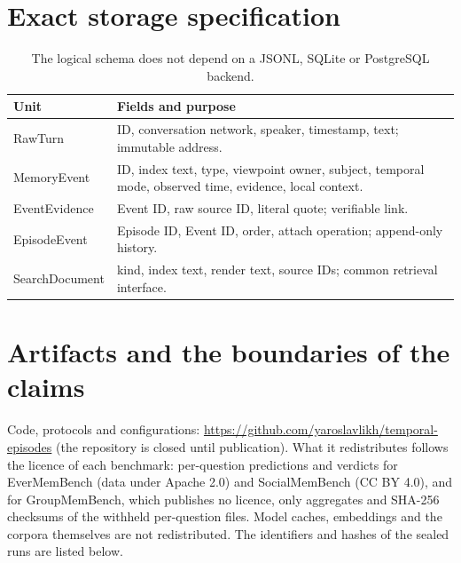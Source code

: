 \documentclass[11pt,a4paper]{article}
\begin{document}
\section{Exact storage specification}

\begin{table}[ht]
\centering\small
\begin{tabularx}{\linewidth}{lX}
\toprule
Unit & Fields and purpose\\
\midrule
RawTurn & ID, conversation network, speaker, timestamp, text; immutable address.\\
MemoryEvent & ID, index text, type, viewpoint owner, subject, temporal mode, observed
time, evidence, local context.\\
EventEvidence & Event ID, raw source ID, literal quote; verifiable link.\\
EpisodeEvent & Episode ID, Event ID, order, attach operation; append-only history.\\
SearchDocument & kind, index text, render text, source IDs; common retrieval interface.\\
\bottomrule
\end{tabularx}
\caption{The logical schema does not depend on a JSONL, SQLite or PostgreSQL backend.}
\end{table}

\section{Artifacts and the boundaries of the claims}

Code, protocols and configurations: \url{https://github.com/yaroslavlikh/temporal-episodes}
(the repository is closed until publication). What it redistributes follows the licence
of each benchmark: per-question predictions and verdicts for EverMemBench (data under
Apache 2.0) and SocialMemBench (CC BY 4.0), and for GroupMemBench, which publishes no
licence, only aggregates and SHA-256 checksums of the withheld per-question files. Model
caches, embeddings and the corpora themselves are not redistributed. The identifiers and
hashes of the sealed runs are listed below.
\end{document}
